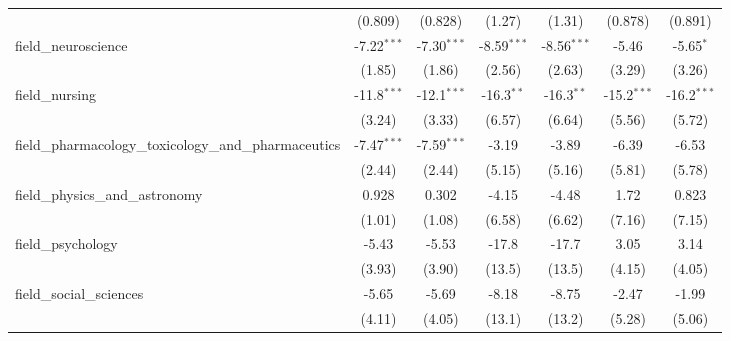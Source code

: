 \begin{tabular}{lcccccc}
                                                               & (0.809)        & (0.828)        & (1.27)        & (1.31)        & (0.878)        & (0.891)\\   
   field\_neuroscience                                         & -7.22$^{***}$  & -7.30$^{***}$  & -8.59$^{***}$ & -8.56$^{***}$ & -5.46          & -5.65$^{*}$\\   
                                                               & (1.85)         & (1.86)         & (2.56)        & (2.63)        & (3.29)         & (3.26)\\   
   field\_nursing                                              & -11.8$^{***}$  & -12.1$^{***}$  & -16.3$^{**}$  & -16.3$^{**}$  & -15.2$^{***}$  & -16.2$^{***}$\\   
                                                               & (3.24)         & (3.33)         & (6.57)        & (6.64)        & (5.56)         & (5.72)\\   
   field\_pharmacology\_toxicology\_and\_pharmaceutics         & -7.47$^{***}$  & -7.59$^{***}$  & -3.19         & -3.89         & -6.39          & -6.53\\   
                                                               & (2.44)         & (2.44)         & (5.15)        & (5.16)        & (5.81)         & (5.78)\\   
   field\_physics\_and\_astronomy                              & 0.928          & 0.302          & -4.15         & -4.48         & 1.72           & 0.823\\   
                                                               & (1.01)         & (1.08)         & (6.58)        & (6.62)        & (7.16)         & (7.15)\\   
   field\_psychology                                           & -5.43          & -5.53          & -17.8         & -17.7         & 3.05           & 3.14\\   
                                                               & (3.93)         & (3.90)         & (13.5)        & (13.5)        & (4.15)         & (4.05)\\   
   field\_social\_sciences                                     & -5.65          & -5.69          & -8.18         & -8.75         & -2.47          & -1.99\\   
                                                               & (4.11)         & (4.05)         & (13.1)        & (13.2)        & (5.28)         & (5.06)\\   

\end{tabular}
